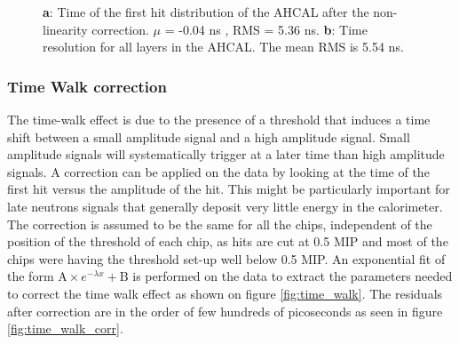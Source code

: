 \begin{figure}[htbp]
	\hfill
	\hfill
\caption[]{\textbf{a}: Time of the first hit distribution of the AHCAL after the non-linearity correction. $\mu$ = -0.04 ns , RMS = 5.36 ns. \textbf{b}: Time resolution for all layers in the AHCAL. The mean RMS is 5.54 ns.}
\end{figure}

\subsubsection{Time Walk correction}
\label{subsec:timewalk}

The time-walk effect is due to the presence of a threshold that induces a time shift between a small amplitude signal and a high amplitude signal. Small amplitude signals will systematically trigger at a later time than high amplitude signals. A correction can be applied on the data by looking at the time of the first hit versus the amplitude of the hit. This might be particularly important for late neutrons signals that generally deposit very little energy in the calorimeter. The correction is assumed to be the same for all the chips, independent of the position of the threshold of each chip, as hits are cut at 0.5 MIP and most of the chips were having the threshold set-up well below 0.5 MIP. An exponential fit of the form $\text{A} \times e^{-\lambda{}x} + \text{B}$ is performed on the data to extract the parameters needed to correct the time walk effect as shown on figure \ref{fig:time_walk}. The residuals after correction are in the order of few hundreds of picoseconds as seen in figure \ref{fig:time_walk_corr}.

